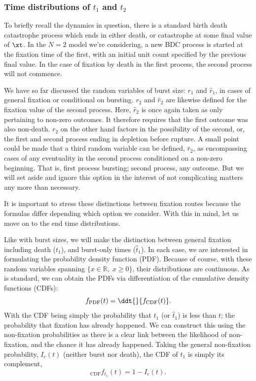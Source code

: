 \subsubsection*{Time distributions of $t_1$ and $t_2$} 

To briefly recall the dynamics in question, there is a standard birth death catastrophe process which ends in either death, or catastrophe at some final value of $\xt$. In the $N=2$ model we're considering, a new BDC process is started at the fixation time of the first, with an initial unit count specified by the previous final value. In the case of fixation by death in the first process, the second process will not commence.\par
We have so far discussed the random variables of burst size: $r_1$ and $\hat r_1$, in cases of general fixation or conditional on bursting. $r_2$ and $\hat r_2$ are likewise defined for the fixation value of the second process. Here, $\hat r_2$ is once again taken as only pertaining to non-zero outcomes. It therefore requires that the first outcome was also non-death. $r_2$ on the other hand factors in the possibility of the second, or, the first and second process ending in depletion before rupture. A small point could be made that a third random variable can be defined, $\bar r_2$, as encompassing cases of any eventuality in the second process conditioned on a non-zero beginning. That is, first process bursting; second process, any outcome. But we will set aside and ignore this option in the interest of not complicating matters any more than necessary.\par 
It is important to stress these distinctions between fixation routes because the formulas differ depending which option we consider. With this in mind, let us move on to the end time distributions.\par
Like with burst sizes, we will make the distinction between general fixation including death ($t_1$), and burst-only times ($\hat t_1$). In each case, we are interested in formulating the probability density function (PDF). Because of course, with these random variables spanning $\{x\in \mathbb{R},\; x\geq 0\}$, their distributions are continuous. As is standard, we can obtain the PDFs via differentiation of the cumulative density functions (CDFs):
$$f_{\text{PDF}}(t) = \ddt{}{ f_{\text{CDF}}(t)}.$$
With the CDF being simply the probability that $t_1$ (or $\hat t_1$) is less than $t$; the probability that fixation has already happened. We can construct this using the non-fixation probabilities as there is a clear link between the likelihood of non-fixation, and the chance it has already happened. Taking the general non-fixation probability, $I_e(t)$ (neither burst nor death), the CDF of $t_1$ is simply its complement, 
$$_{\text{CDF}}f_{t_1}(t) = 1 - I_e(t).$$

